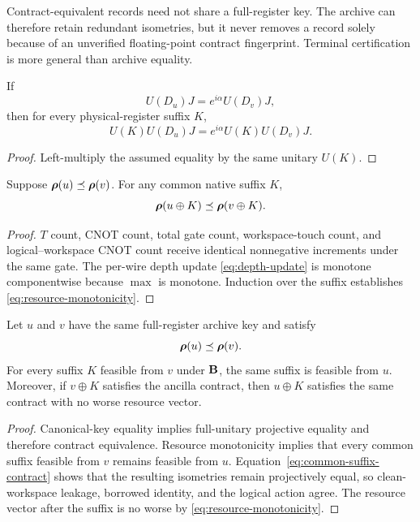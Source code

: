 \begin{remark}
Contract-equivalent records need not share a full-register key. The archive can therefore retain redundant isometries, but it never removes a record solely because of an unverified floating-point contract fingerprint. Terminal certification is more general than archive equality.
\end{remark}

\begin{lemma}
If
\begin{equation}
U(D_u)J=e^{i\alpha}U(D_v)J,
\end{equation}
then for every physical-register suffix $K$,
\begin{equation}
U(K)U(D_u)J=e^{i\alpha}U(K)U(D_v)J.
\label{eq:common-suffix-contract}
\end{equation}
\end{lemma}
\begin{proof}
Left-multiply the assumed equality by the same unitary $U(K)$.
\end{proof}

\begin{lemma}
Suppose $\boldsymbol{\rho}(u)\preceq\boldsymbol{\rho}(v)$. For any common native suffix $K$,
\begin{equation}
\boldsymbol{\rho}(u\oplus K)\preceq\boldsymbol{\rho}(v\oplus K).
\label{eq:resource-monotonicity}
\end{equation}
\end{lemma}
\begin{proof}
$T$ count, CNOT count, total gate count, workspace-touch count, and logical--workspace CNOT count receive identical nonnegative increments under the same gate. The per-wire depth update \eqref{eq:depth-update} is monotone componentwise because $\max$ is monotone. Induction over the suffix establishes \eqref{eq:resource-monotonicity}.
\end{proof}

\begin{theorem}
Let $u$ and $v$ have the same full-register archive key and satisfy
\begin{equation}
\boldsymbol{\rho}(u)\preceq\boldsymbol{\rho}(v).
\end{equation}
For every suffix $K$ feasible from $v$ under $\mathbf{B}$, the same suffix is feasible from $u$. Moreover, if $v\oplus K$ satisfies the ancilla contract, then $u\oplus K$ satisfies the same contract with no worse resource vector.
\end{theorem}
\begin{proof}
Canonical-key equality implies full-unitary projective equality and therefore contract equivalence. Resource monotonicity implies that every common suffix feasible from $v$ remains feasible from $u$. Equation~\eqref{eq:common-suffix-contract} shows that the resulting isometries remain projectively equal, so clean-workspace leakage, borrowed identity, and the logical action agree. The resource vector after the suffix is no worse by \eqref{eq:resource-monotonicity}.
\end{proof}

